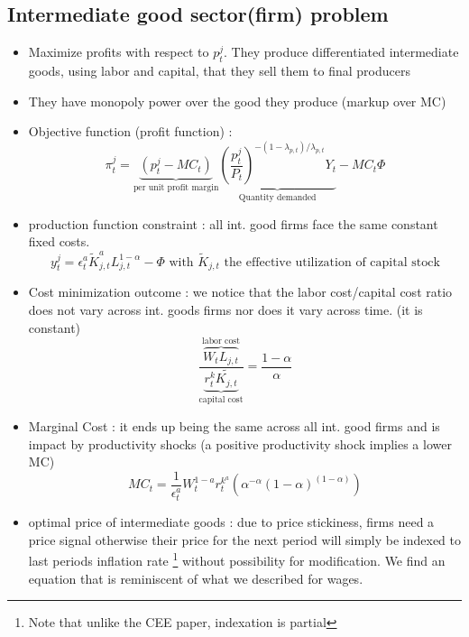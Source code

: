 \documentclass{article}
\begin{document}
\subsection{Intermediate good sector(firm) problem}
\begin{itemize}
    \item Maximize profits with respect to $p_t^j$. They produce differentiated intermediate goods, using labor and capital, that they sell them to final producers
    \item They have monopoly power over the good they produce (markup over MC)
    \item Objective function (profit function) : 
    \begin{equation}
        \pi_t^j = \underbrace{(p_t^j-MC_t)}_{\text{per unit profit margin}}\underbrace{(\frac{p_t^j}{P_t})^{-(1-\lambda_{p,t})/\lambda_{p,t}}Y_t}_{\text{Quantity demanded}} - MC_t\Phi
    \end{equation}
    \item production function constraint : all int. good firms face the same constant fixed costs.  
    \begin{equation}
        y_t^j = \epsilon_t^a\tilde{K}_{j,t}^aL_{j,t}^{1-\alpha}-\Phi \text{ with $\tilde{K}_{j,t}$ the effective utilization of capital stock}
    \end{equation}
    \item Cost minimization outcome : we notice that the labor cost/capital cost ratio does not vary across int. goods firms nor does it vary across time. (it is constant)
    \begin{equation}
        \frac{\overbrace{W_tL_{j,t}}^{\text{labor cost}}}{\underbrace{r_t^k\tilde{K_{j,t}}}_{\text{capital cost}}} = \frac{1-\alpha}{\alpha}
    \end{equation}
    \item Marginal Cost : it ends up being the same across all int. good firms and is impact by productivity shocks (a positive productivity shock implies a lower MC)
    \begin{equation}
        MC_t = \frac{1}{\epsilon_t^a}W_t^{1-a}r_t^{k^a}(\alpha^{-\alpha}(1-\alpha)^{(1-\alpha)})
    \end{equation}
    \item optimal price of intermediate goods : due to price stickiness, firms need a price signal otherwise their price for the next period will simply be indexed to last periods inflation rate \footnote{Note that unlike the CEE paper, indexation is partial} without possibility for modification. We find an equation that is reminiscent of what we described for wages. 

\end{itemize}
\end{document}
